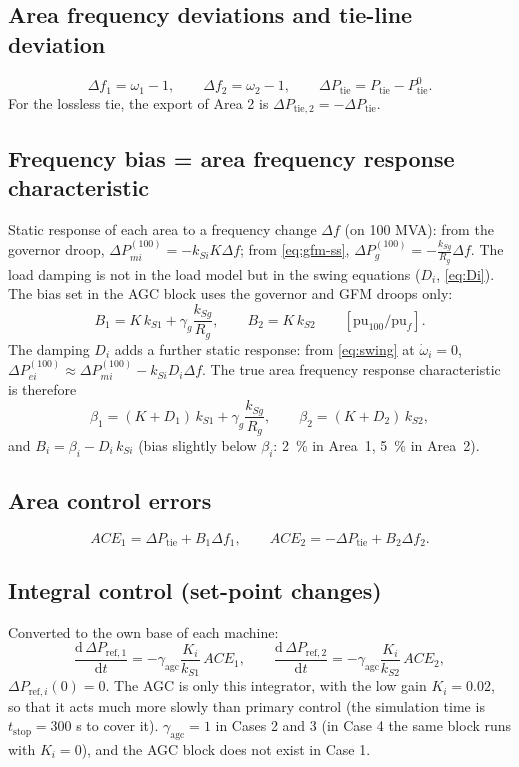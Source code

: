 \documentclass[11pt,a4paper]{article}
\numberwithin{equation}{section}
\newcommand{\dd}{\mathrm{d}}
\begin{document}
\subsection{Area frequency deviations and tie-line deviation}
\begin{equation}
\Delta f_1 = \omega_1 - 1,\qquad \Delta f_2 = \omega_2 - 1,\qquad
\Delta P_{\text{tie}} = P_{\text{tie}} - P_{\text{tie}}^0 .
\end{equation}
For the lossless tie, the export of Area 2 is $\Delta P_{\text{tie},2} = -\Delta P_{\text{tie}}$.

\subsection{Frequency bias = area frequency response characteristic}
Static response of each area to a frequency change $\Delta f$ (on 100 MVA): from the governor droop, $\Delta P_{mi}^{(100)} = -k_{Si}K\Delta f$; from \eqref{eq:gfm-ss}, $\Delta P_g^{(100)} = -\frac{k_{Sg}}{R_g}\Delta f$. The load damping is not in the load model but in the swing equations ($D_i$, \eqref{eq:Di}). The bias set in the AGC block uses the governor and GFM droops only:
\begin{equation}
\boxed{B_1 = K\,k_{S1} + \gamma_g\frac{k_{Sg}}{R_g},\qquad B_2 = K\,k_{S2}\qquad[\text{pu}_{100}/\text{pu}_f].}
\end{equation}
The damping $D_i$ adds a further static response: from \eqref{eq:swing} at $\dot\omega_i=0$, $\Delta P_{ei}^{(100)} \approx \Delta P_{mi}^{(100)} - k_{Si}D_i\Delta f$. The true area frequency response characteristic is therefore
\begin{equation}
\beta_1 = (K+D_1)\,k_{S1} + \gamma_g\frac{k_{Sg}}{R_g},\qquad \beta_2 = (K+D_2)\,k_{S2},
\end{equation}
and $B_i = \beta_i - D_i\,k_{Si}$ (bias slightly below $\beta_i$: 2~\% in Area~1, 5~\% in Area~2).

\subsection{Area control errors}
\begin{equation}
\boxed{ACE_1 = \Delta P_{\text{tie}} + B_1\Delta f_1,\qquad ACE_2 = -\Delta P_{\text{tie}} + B_2\Delta f_2 .}
\end{equation}

\subsection{Integral control (set-point changes)}
Converted to the own base of each machine:
\begin{equation}
\boxed{\frac{\dd\,\Delta P_{\text{ref},1}}{\dd t} = -\gamma_{\text{agc}}\frac{K_i}{k_{S1}}\,ACE_1,\qquad
\frac{\dd\,\Delta P_{\text{ref},2}}{\dd t} = -\gamma_{\text{agc}}\frac{K_i}{k_{S2}}\,ACE_2,}
\end{equation}
$\Delta P_{\text{ref},i}(0)=0$. The AGC is only this integrator, with the low gain $K_i = 0.02$, so that it acts much more slowly than primary control (the simulation time is $t_{\text{stop}} = 300$ s to cover it). $\gamma_{\text{agc}}=1$ in Cases 2 and 3 (in Case 4 the same block runs with $K_i=0$), and the AGC block does not exist in Case 1.
\end{document}

